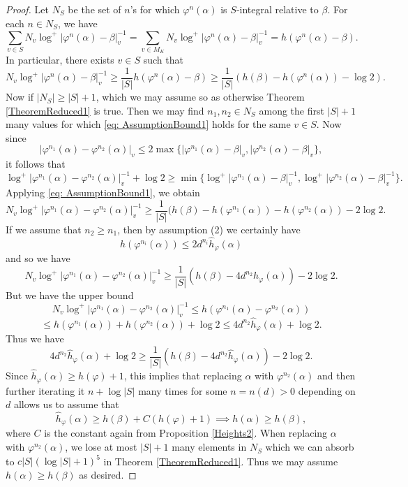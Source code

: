 \documentclass[10pt, reqno]{amsart}
\newcommand{\vphi}{\varphi}
\newcommand{\h}{\widehat{h}}
\numberwithin{theorem}{section}
\numberwithin{equation}{section}
\numberwithin{example}{section}
\numberwithin{definition}{section}
\begin{document}
\begin{proof}
Let $N_S$ be the set of $n$'s for which $\vphi^n(\alpha)$ is $S$-integral relative to $\beta$. For each $n \in N_S$, we have 
$$\sum_{v \in S} N_v \log^+|\vphi^n(\alpha) - \beta|^{-1}_v = \sum_{v \in M_K} N_v \log^+|\vphi^n(\alpha) - \beta|_v^{-1} = h(\vphi^n(\alpha) - \beta).$$
In particular, there exists $v \in S$ such that 
\begin{equation} \label{eq: AssumptionBound1}
N_v \log^+|\vphi^n(\alpha) - \beta|^{-1}_v \geq \frac{1}{|S|} h(\vphi^n(\alpha) - \beta) \geq \frac{1}{|S|} \left( h(\beta) - h(\vphi^n(\alpha)) - \log 2 \right).
\end{equation}
Now if $|N_S| \geq |S|+1$, which we may assume so as otherwise Theorem \ref{TheoremReduced1} is true. Then we may find $n_1,n_2 \in N_S$ among the first $|S|+1$ many values for which \eqref{eq: AssumptionBound1} holds for the same $v \in S$. Now since 
$$|\vphi^{n_1}(\alpha) - \vphi^{n_2}(\alpha)|_v \leq 2 \max\{ |\vphi^{n_1}(\alpha) - \beta|_v , |\vphi^{n_2}(\alpha) - \beta|_v\},$$
it follows that 
$$\log^+|\vphi^{n_1}(\alpha) - \vphi^{n_2}(\alpha)|^{-1}_v + \log 2 \geq \min\{\log^+|\vphi^{n_1}(\alpha) - \beta|^{-1}_v, \log^+|\vphi^{n_2}(\alpha) - \beta|^{-1}_v\}.$$
Applying \eqref{eq: AssumptionBound1}, we obtain 
$$N_v \log^+|\vphi^{n_1}(\alpha) - \vphi^{n_2}(\alpha)|_v^{-1} \geq \frac{1}{|S|} (h(\beta) - h(\vphi^{n_1}(\alpha)) - h(\vphi^{n_2}(\alpha)) - 2 \log 2.$$
If we assume that $n_2 \geq n_1$, then by assumption (2) we certainly have
$$h(\vphi^{n_i}(\alpha)) \leq 2 d^{n_i} \h_{\vphi}(\alpha)$$
and so we have 
$$N_v \log^+|\vphi^{n_1}(\alpha) - \vphi^{n_2}(\alpha)|^{-1}_v \geq \frac{1}{|S|} (h(\beta) - 4 d^{n_2} \h_{\vphi}(\alpha)) - 2 \log 2.$$
But we have the upper bound 
$$N_v \log^+|\vphi^{n_1}(\alpha) - \vphi^{n_2}(\alpha)|_v^{-1} \leq h(\vphi^{n_1}(\alpha) - \vphi^{n_2}(\alpha)) $$
$$\leq h(\vphi^{n_1}(\alpha)) + h(\vphi^{n_2}(\alpha)) + \log 2 \leq 4 d^{n_2} \h_{\vphi}(\alpha) + \log 2.$$
Thus we have 
$$4d^{n_2} \h_{\vphi}(\alpha) + \log 2 \geq \frac{1}{|S|} (h(\beta) - 4d^{n_2} \h_{\vphi}(\alpha)) - 2 \log 2.$$
Since $\h_{\vphi}(\alpha) \geq h(\vphi) + 1$, this implies that replacing $\alpha$ with $\vphi^{n_2}(\alpha)$ and then further iterating it $n + \log |S|$ many times for some $n = n(d) > 0$ depending on $d$ allows us to assume that 
$$\h_{\vphi}(\alpha) \geq  h(\beta) + C(h(\vphi)+1) \implies h(\alpha) \geq h(\beta),$$
where $C$ is the constant again from Proposition \ref{Heights2}. When replacing $\alpha$ with $\vphi^{n_2}(\alpha)$, we lose at most $|S|+1$ many elements in $N_S$ which we can absorb to $c |S|( \log |S|+1)^5$ in Theorem \ref{TheoremReduced1}. Thus we may assume $h(\alpha) \geq h(\beta)$ as desired.
\end{proof}
\end{document}
